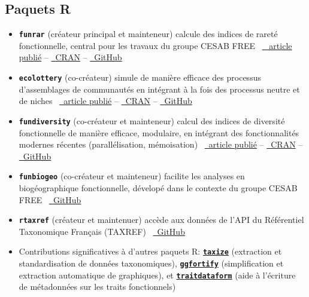 \documentclass[12pt,a4paper,]{article}
\begin{document}
\subsection{Paquets R}\label{paquets-r}

\begin{itemize}
\item
  \textbf{\texttt{funrar}} (créateur principal et mainteneur)
  \hfill\break calcule des indices de rareté fonctionnelle, central pour
  les travaux du groupe CESAB FREE
  \hfill\break ~\href{https://doi.org/10.1111/ddi.12629}{\faFile*~
  article publié} --
  \href{https://cran.r-project.org/package=funrar}{\faRProject~CRAN} --
  \href{https://github.com/Rekyt/funrar}{\faGithub~GitHub}
\item
  \textbf{\texttt{ecolottery}} (co-créateur) \hfill\break simule de
  manière efficace des processus d'assemblages de communautés en
  intégrant à la fois des processus neutre et de niches
  \hfill\break ~\href{https://doi.org/10.1111/2041-210X.12918}{\faFile*~article
  publié} --
  \href{https://cran.r-project.org/package=ecolottery}{\faRProject~CRAN}
  -- \href{https://github.com/frmunoz/ecolottery}{\faGithub~GitHub}
\item
  \textbf{\texttt{fundiversity}} (co-créateur et mainteneur)
  \hfill\break calcul des indices de diversité fonctionnelle de manière
  efficace, modulaire, en intégrant des fonctionnalités modernes
  récentes (parallélisation, mémoisation)
  \hfill\break ~\href{https://doi.org/10.1111/ecog.06585}{\faFile*~article
  publié} --
  \href{https://cran.r-project.org/package=fundiversity}{\faRProject~CRAN}
  -- \href{https://github.com/bisaloo/fundiversity}{\faGithub~GitHub}
\item
  \textbf{\texttt{funbiogeo}} (co-créateur et mainteneur)
  \hfill\break facilite les analyses en biogéographique fonctionnelle,
  dévelopé dans le contexte du groupe CESAB FREE
  \hfill\break ~\href{https://github.com/FRBCesab/funbiogeo}{\faGithub~GitHub}
\item
  \textbf{\texttt{rtaxref}} (créateur et maintenuer) \hfill\break accède
  aux données de l'API du Référentiel Taxonomique Français (TAXREF)
  \hfill\break ~\href{https://github.com/Rekyt/rtaxref}{\faGithub~GitHub}
\item
  Contributions significatives à d'autres paquets R:
  \href{https://cran.r-project.org/package=taxize}{\textbf{\texttt{taxize}}}
  (extraction et standardisation de données taxonomiques),
  \href{https://cran.r-project.org/package=ggfortify}{\textbf{\texttt{ggfortify}}}
  (simplification et extraction automatique de graphiques), et
  \href{https://cran.r-project.org/package=traitdataform}{\textbf{\texttt{traitdataform}}}
  (aide à l'écriture de métadonnées sur les traits fonctionnels)
\end{itemize}
\end{document}
